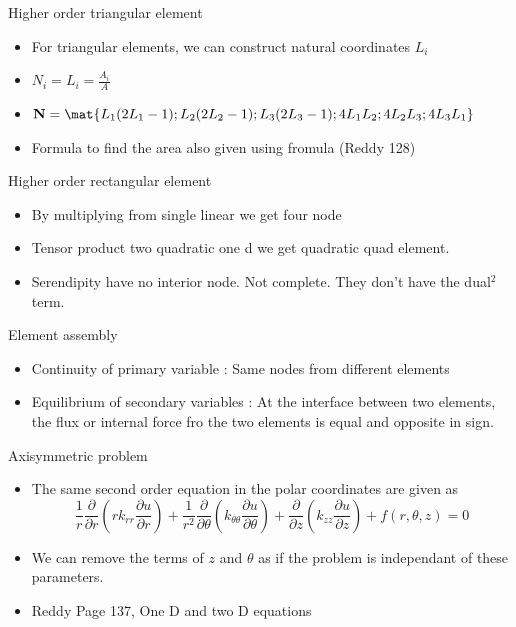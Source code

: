 	\begin{frame}{Higher order triangular element}
		\begin{itemize}
			\item For triangular elements, we can construct natural coordinates $L_i$
			\item $N_i = L_i = \frac{A_i}{A}$
			\item $\ve{N} = \mat{L_1(2L_1-1);L_2(2L_2-1);L_3(2L_3-1);4L_1L_2;4L_2L_3;4L_3L_1}$
			\item Formula to find the area also given using fromula (Reddy 128)
		\end{itemize}
 	\end{frame}


	\begin{frame}{Higher order rectangular element}
		\begin{itemize}
			\item By multiplying from single linear we get four node
			\item Tensor product two quadratic one d we get quadratic quad element. 
			\item Serendipity have no interior node. Not complete. They don't have the dual$^2$ term. 
		\end{itemize}
	\end{frame}



	\begin{frame}{Element assembly}
		\begin{itemize}
			\item Continuity of primary variable : Same nodes from different elements
			\item Equilibrium of secondary variables : At the interface between two elements, the flux or internal force fro the two elements is equal and opposite in sign. 
			
		\end{itemize}
	\end{frame}



	\begin{frame}{Axisymmetric problem}
		\begin{itemize}
			\item   The same second order equation in the polar coordinates are given as 
			\begin{equation}
				\frac{1}{r}\frac{\partial }{\partial r}\left(r k_{rr} \frac{\partial u}{\partial r} \right)
				+ \frac{1}{r^2}\frac{\partial }{\partial \theta}\left( k_{\theta\theta} \frac{\partial u}{\partial \theta} \right)
				+ \frac{\partial }{\partial z}\left(k_{zz} \frac{\partial u}{\partial z} \right) + f(r,\theta,z)=0
			\end{equation}
			\item We can remove the terms of $z$ and $\theta$ as if the problem is independant of these parameters. 
			\item Reddy Page 137, One D and two D equations
		\end{itemize}
	\end{frame}



